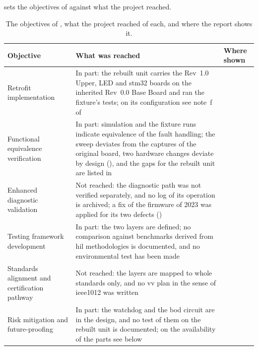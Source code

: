  sets the objectives of  against what the project reached.

\begin{table}[htbp]
	\centering
	\caption[Objectives and What Was Reached]{The objectives of , what the project reached of each, and where the report shows it.}
	\label{tab:objectives}
	\small
	\begin{tabular}{@{}>{\raggedright\arraybackslash}p{} >{\raggedright\arraybackslash}p{} >{\raggedright\arraybackslash}p{}@{}}
		\toprule
		Objective & What was reached & Where shown \\
		\midrule
		Retrofit implementation & In part: the rebuilt unit carries the Rev~1.0 Upper, LED and \gls{stm32} boards on the inherited Rev~0.0 Base Board and ran the fixture's tests; on its configuration see note~f of \Cref{tab:results_summary} & \Cref{sec:pcb_design_impl,tab:results_summary} \\
		Functional equivalence verification & In part: simulation and the fixture runs indicate equivalence of the fault handling; the sweep deviates from the captures of the original board, two hardware changes deviate by design (\Cref{sec:en50716_modifications}), and the gaps for the rebuilt unit are listed in \Cref{tab:evidence_state} & \Cref{subsec:equivalence_discussion,tab:evidence_state} \\
		Enhanced diagnostic validation & Not reached: the diagnostic path was not verified separately, and no log of its operation is archived; a fix of the firmware of 2023 was applied for its two defects (\Cref{tab:bug_taxonomy}) & \Cref{sec:diagnostic_resolution} \\
		Testing framework development & In part: the two layers are defined; no comparison against benchmarks derived from \gls{hil} methodologies is documented, and no environmental test has been made & \Cref{chap:testing,sec:validation_context} \\
		Standards alignment and certification pathway & Not reached: the layers are mapped to whole standards only, and no \gls{vv} plan in the sense of \gls{ieee1012} was written & \Cref{sec:safety_compliance} \\
		Risk mitigation and future-proofing & In part: the watchdog and the \gls{bod} circuit are in the design, and no test of them on the rebuilt unit is documented; on the availability of the parts see below & \Cref{sec:redundancy_failsafe} \\
		\bottomrule
	\end{tabular}
\end{table}

